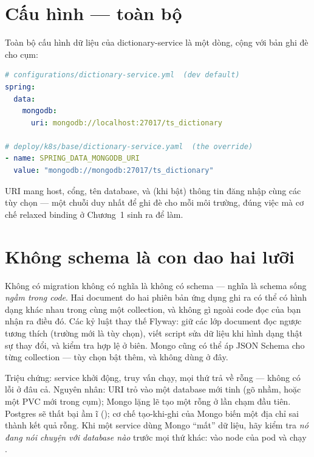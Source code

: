 \section{Cấu hình --- toàn bộ}

Toàn bộ cấu hình dữ liệu của dictionary-service là một dòng, cộng với
bản ghi đè cho cụm:

\begin{lstlisting}[language=yaml]
# configurations/dictionary-service.yml  (dev default)
spring:
  data:
    mongodb:
      uri: mongodb://localhost:27017/ts_dictionary

# deploy/k8s/base/dictionary-service.yaml  (the override)
- name: SPRING_DATA_MONGODB_URI
  value: "mongodb://mongodb:27017/ts_dictionary"
\end{lstlisting}

URI mang host, cổng, tên database, và (khi bật) thông tin đăng nhập cùng
các tùy chọn --- một chuỗi duy nhất để ghi đè cho mỗi môi trường, đúng
việc mà cơ chế relaxed binding ở Chương~1 sinh ra để làm.

\section{Không schema là con dao hai lưỡi}

Không có migration không có nghĩa là không có schema --- nghĩa là schema
sống \emph{ngầm trong code}. Hai document do hai phiên bản ứng dụng ghi
ra có thể có hình dạng khác nhau trong cùng một collection, và không gì
ngoài code đọc của bạn nhận ra điều đó. Các kỷ luật thay thế Flyway: giữ
các lớp document đọc ngược tương thích (trường mới là tùy chọn), viết
script sửa dữ liệu khi hình dạng thật sự thay đổi, và kiểm tra hợp lệ ở
biên. Mongo cũng có thể áp JSON Schema cho từng collection --- tùy chọn
bật thêm, và không dùng ở đây.

\begin{pitfall}
Triệu chứng: service khởi động, truy vấn chạy, mọi thứ trả về rỗng ---
không có lỗi ở đâu cả. Nguyên nhân: URI trỏ vào một database mới tinh
(gõ nhầm, hoặc một PVC mới trong cụm); Mongo lặng lẽ tạo một
 rỗng ở lần chạm đầu tiên. Postgres sẽ thất bại ầm ĩ
(); cơ chế tạo-khi-ghi của Mongo biến một
địa chỉ sai thành kết quả rỗng. Khi một service dùng Mongo ``mất'' dữ
liệu, hãy kiểm tra \emph{nó đang nói chuyện với database nào} trước mọi
thứ khác:  vào node của pod và chạy
.
\end{pitfall}

